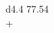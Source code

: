 \documentclass[border = 1mm]{standalone}
\begin{document}
    
\begin{tabular}{d{4.4}}
    77.54 \\
    + \\
    \hline
     \\
    \hline\\
\end{tabular}
\end{document}
